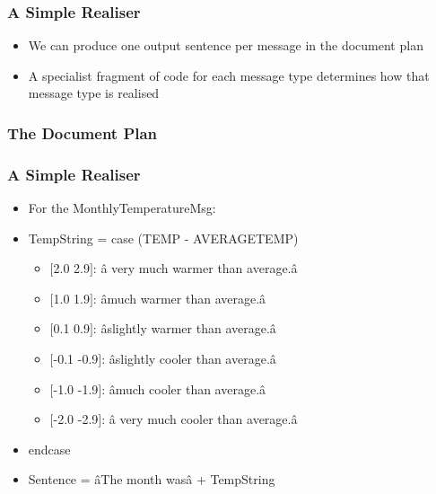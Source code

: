 \documentclass[compress,color=usenames]{beamer}
\begin{document}
\begin{frame}
\frametitle{A Simple Realiser}

\label{f186}
\begin{itemize}
\item { {We can produce one output sentence per message in the document plan}}
\item { {A specialist fragment of code for each message type determines how that message type is realised}}
\end{itemize}
 
\end{frame}

\begin{frame}
\frametitle{The Document Plan}

\label{f188}
 
\end{frame}

\begin{frame}
\frametitle{A Simple Realiser}

\label{f190}
\begin{itemize}
\item { {For the MonthlyTemperatureMsg:}}
\item { {TempString = case (TEMP - AVERAGETEMP)}}
\begin{itemize}
\item \mbox{$[$}2.0 2.9\mbox{$]$}: \^a very much warmer than average.\^a
\item \mbox{$[$}1.0 1.9\mbox{$]$}: \^amuch warmer than average.\^a
\item \mbox{$[$}0.1 0.9\mbox{$]$}: \^aslightly warmer than average.\^a
\item \mbox{$[$}-0.1 -0.9\mbox{$]$}: \^aslightly cooler than average.\^a
\item \mbox{$[$}-1.0 -1.9\mbox{$]$}: \^amuch cooler than average.\^a
\item \mbox{$[$}-2.0 -2.9\mbox{$]$}: \^a very much cooler than average.\^a
\end{itemize}
\item { {endcase}}
\item { {Sentence = \^aThe month was\^a + TempString}}
\end{itemize}
 
\end{frame}
\end{document}
